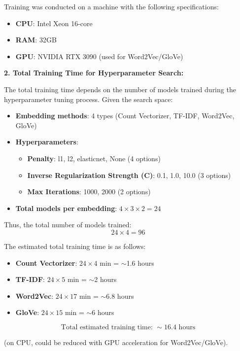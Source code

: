 Training was conducted on a machine with the following specifications:  
\begin{itemize}
    \item \textbf{CPU}: Intel Xeon 16-core  
    \item \textbf{RAM}: 32GB  
    \item \textbf{GPU}: NVIDIA RTX 3090 (used for Word2Vec/GloVe)  
\end{itemize}

\textbf{2. Total Training Time for Hyperparameter Search:}  

The total training time depends on the number of models trained during the hyperparameter tuning process. Given the search space:  

\begin{itemize}
    \item \textbf{Embedding methods}: 4 types (Count Vectorizer, TF-IDF, Word2Vec, GloVe)  
    \item \textbf{Hyperparameters}:  
    \begin{itemize}
        \item \textbf{Penalty}: l1, l2, elasticnet, None (4 options)  
        \item \textbf{Inverse Regularization Strength (C)}: 0.1, 1.0, 10.0 (3 options)  
        \item \textbf{Max Iterations}: 1000, 2000 (2 options)  
    \end{itemize}
    \item \textbf{Total models per embedding}: $4 \times 3 \times 2 = 24$  
\end{itemize}

Thus, the total number of models trained:  
\[
24 \times 4 = 96
\]

The estimated total training time is as follows:  

\begin{itemize}
    \item \textbf{Count Vectorizer}: $24 \times 4$ min = $\sim$1.6 hours  
    \item \textbf{TF-IDF}: $24 \times 5$ min = $\sim$2 hours  
    \item \textbf{Word2Vec}: $24 \times 17$ min = $\sim$6.8 hours  
    \item \textbf{GloVe}: $24 \times 15$ min = $\sim$6 hours  
\end{itemize}

\[
\text{Total estimated training time: } \sim 16.4 \text{ hours}
\]

(on CPU, could be reduced with GPU acceleration for Word2Vec/GloVe).  

